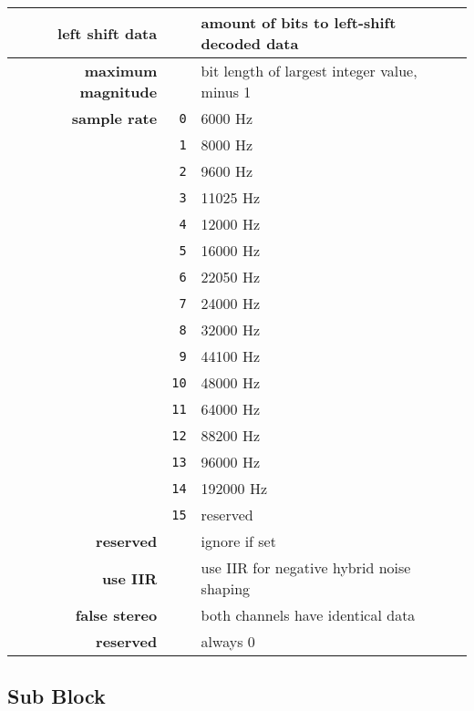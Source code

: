 \begin{table}[h]
{\begin{tabular}{rrl}
\hline
\textbf{left shift data} & & amount of bits to left-shift decoded data \\
\hline
\textbf{maximum magnitude} & & bit length of largest integer value, minus 1 \\
\hline
\textbf{sample rate} & \texttt{0} & 6000 Hz \\
& \texttt{1} & 8000 Hz \\
& \texttt{2} & 9600 Hz \\
& \texttt{3} & 11025 Hz \\
& \texttt{4} & 12000 Hz \\
& \texttt{5} & 16000 Hz \\
& \texttt{6} & 22050 Hz \\
& \texttt{7} & 24000 Hz \\
& \texttt{8} & 32000 Hz \\
& \texttt{9} & 44100 Hz \\
& \texttt{10} & 48000 Hz \\
& \texttt{11} & 64000 Hz \\
& \texttt{12} & 88200 Hz \\
& \texttt{13} & 96000 Hz \\
& \texttt{14} & 192000 Hz \\
& \texttt{15} & reserved \\
\hline
\textbf{reserved} & & ignore if set \\
\hline
\textbf{use IIR} & & use IIR for negative hybrid noise shaping \\
\hline
\textbf{false stereo} & & both channels have identical data \\
\hline
\textbf{reserved} & & always 0 \\
\end{tabular}
}
\end{table}

\clearpage

\subsection{Sub Block}

